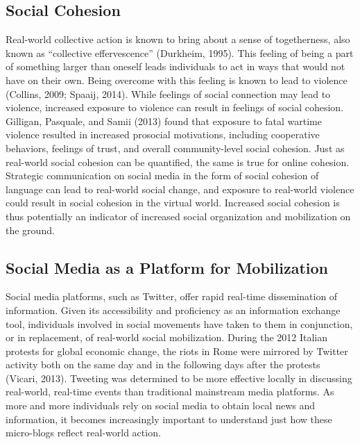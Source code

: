 \documentclass[english,man]{apa6}
\begin{document}
\hypertarget{social-cohesion}{%
\subsection{Social Cohesion}\label{social-cohesion}}

Real-world collective action is known to bring about a sense of togetherness, also known as \enquote{collective effervescence} (Durkheim, 1995). This feeling of being a part of something larger than oneself leads individuals to act in ways that would not have on their own. Being overcome with this feeling is known to lead to violence (Collins, 2009; Spaaij, 2014). While feelings of social connection may lead to violence, increased exposure to violence can result in feelings of social cohesion. Gilligan, Pasquale, and Samii (2013) found that exposure to fatal wartime violence resulted in increased prosocial motivations, including cooperative behaviors, feelings of trust, and overall community-level social cohesion. Just as real-world social cohesion can be quantified, the same is true for online cohesion. Strategic communication on social media in the form of social cohesion of language can lead to real-world social change, and exposure to real-world violence could result in social cohesion in the virtual world. Increased social cohesion is thus potentially an indicator of increased social organization and mobilization on the ground.

\hypertarget{social-media-as-a-platform-for-mobilization}{%
\subsection{Social Media as a Platform for Mobilization}\label{social-media-as-a-platform-for-mobilization}}

Social media platforms, such as Twitter, offer rapid real-time dissemination of information. Given its accessibility and proficiency as an information exchange tool, individuals involved in social movements have taken to them in conjunction, or in replacement, of real-world social mobilization. During the 2012 Italian protests for global economic change, the riots in Rome were mirrored by Twitter activity both on the same day and in the following days after the protests (Vicari, 2013). Tweeting was determined to be more effective locally in discussing real-world, real-time events than traditional mainstream media platforms. As more and more individuals rely on social media to obtain local news and information, it becomes increasingly important to understand just how these micro-blogs reflect real-world action.
\end{document}
